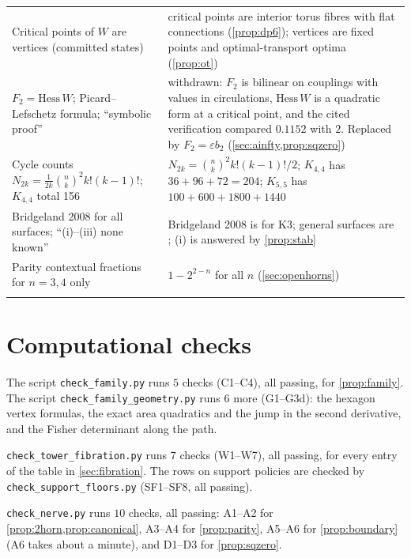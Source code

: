 \documentclass[11pt]{article}
\theoremstyle{definition}
\theoremstyle{remark}
\begin{document}
\begin{center}
\begin{tabular}{@{}R{0.36\textwidth}R{0.56\textwidth}@{}}
Critical points of $W$ are vertices (committed states) & critical points are interior torus fibres with flat
connections (\cref{prop:dp6}); vertices are fixed points and optimal-transport optima (\cref{prop:ot})\\\addlinespace[3pt]
$F_2=\mathrm{Hess}\,W$; Picard--Lefschetz formula; ``symbolic proof'' & withdrawn: $F_2$ is bilinear on couplings
with values in circulations, $\mathrm{Hess}\,W$ is a quadratic form at a critical point, and the cited verification
compared $0.1152$ with $2$. Replaced by $F_2=\varepsilon b_2$ (\cref{sec:ainfty,prop:sqzero})\\\addlinespace[3pt]
Cycle counts $N_{2k}=\frac1{2k}\binom nk^2k!(k-1)!$; $K_{4,4}$ total 156 & $N_{2k}=\binom nk^2k!(k-1)!/2$; $K_{4,4}$ has
$36+96+72=204$; $K_{5,5}$ has $100+600+1800+1440$\\\addlinespace[3pt]
Bridgeland 2008 for all surfaces; ``(i)--(iii) none known'' & Bridgeland 2008 is for K3; general surfaces are
\cite{ArcaraBertram2013}; (i) is answered by \cref{prop:stab}\\\addlinespace[3pt]
Parity contextual fractions for $n=3,4$ only & $1-2^{2-n}$ for all $n$ (\cref{sec:openhorns})\\\addlinespace[3pt]
\bottomrule
\end{tabular}
\end{center}

\section{Computational checks}\label{app:code}

The script \texttt{check\_family.py} runs $5$ checks (C1--C4), all passing, for \cref{prop:family}. The script \texttt{check\_family\_geometry.py} runs $6$ more (G1--G3d): the hexagon vertex formulas, the exact area quadratics and the jump in the second derivative, and the Fisher determinant along the path.

\texttt{check\_tower\_fibration.py} runs $7$ checks (W1--W7), all passing, for every entry of the table in
\cref{sec:fibration}. The rows on support policies are checked by \texttt{check\_support\_floors.py} (SF1--SF8, all passing).

\texttt{check\_nerve.py} runs $10$ checks, all passing: A1--A2 for \cref{prop:2horn,prop:canonical}, A3--A4 for
\cref{prop:parity}, A5--A6 for \cref{prop:boundary} (A6 takes about a minute), and D1--D3 for
\cref{prop:sqzero}.
\end{document}
